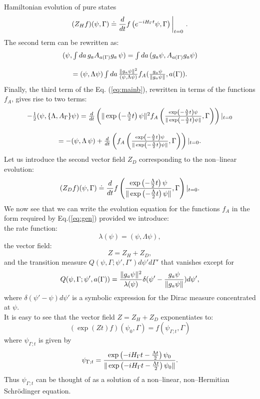 \documentclass[12pt]{article}
\def\be{\begin{equation}}
\def\ee{\end{equation}}
\def\ba{\begin{array}}
\def\ea{\end{array}}
\begin{document}
Hamiltonian evolution of pure states \be (Z_H f) (\psi,\Gamma)\doteq
{d\over dt}f\left (e^{-iH_{\Gamma} t} \psi,\Gamma \right)\bigg\vert_{t=0} \
.\label{eq:ham} \ee The second term can be rewritten as: \be \ba{c}
(\psi,\int da\, g_a A_{a(\Gamma)}g_a\, \psi) =\int da\,
(g_a\psi,A_{a(\Gamma)}g_a\psi)\cr\cr =(\psi,\Lambda\psi)\int da\, {\Vert
g_a\psi\Vert^2 \over {(\psi,\Lambda\psi )}} f_A({g_a\psi\over {\Vert
g_a\psi\Vert}},a(\Gamma)). \ea\label{eq:second} \ee Finally, the third term
of the Eq. (\ref{eq:mainb}), rewritten in terms of the functions $f_A$,
gives rise to two terms: \be \ba{c} -{1\over
2}(\psi,\{\Lambda,A_\Gamma\}\psi )= {d\over dt}\left( \Vert \exp\left(
-{\Lambda\over 2}t\right)\psi\Vert^2 f_A\left({\exp\left( -{\Lambda\over
2}t\right)\psi\over \Vert \exp\left( -{\Lambda\over
2}t\right)\psi\Vert},\Gamma\right)\right) \vert_{t=0}\cr\cr =
-(\psi,\Lambda\, \psi ) + {d\over dt}\left( f_A\left({\exp\left(
-{\Lambda\over 2}t\right)\psi\over \Vert \exp\left( -{\Lambda\over
2}t\right)\psi\Vert},\Gamma\right) \right)\vert_{t=0}. \ea \ee Let us
introduce the second vector field $Z_D$ corresponding to the non--linear
evolution: \be (Z_D f) (\psi,\Gamma)\doteq {d\over dt}f\left({\exp\left(
-{\Lambda\over 2}t \right)\psi\over \Vert \exp\left( -{\Lambda\over
2}t\right)\psi\Vert},\Gamma\right)\vert_{t=0}. \ee We now see that we can
write the evolution equation for the functions $f_A$ in the form required
by Eq.(\ref{eq:gen}) provided we introduce:\\ the rate function: \be
\lambda(\psi)=(\psi,\Lambda\psi), \label{eq:lam2}\ee the vector field: \be
Z=Z_H+Z_D ,\ee and the transition measure
$Q(\psi,\Gamma;\psi',\Gamma')d\psi'd\Gamma'$ that vanishes except for \be
Q(\psi,\Gamma;\psi',a(\Gamma))={\Vert g_a \psi \Vert^2\over
{\lambda(\psi)}} \delta (\psi'- {g_a\psi\over{\Vert g_a\psi\Vert}})d\psi',
\ee where $\delta(\psi'-\psi)d\psi'$ is a symbolic expression for the Dirac
measure concentrated at $\psi$.\\ It is easy to see that the vector field
$Z=Z_H+Z_D$ exponentiates to: \be \left(\exp
(Zt)f\right)(\psi_0,\Gamma)=f\left(\psi_{\Gamma;t},\Gamma\right) \ee where
$\psi_{\Gamma;t}$ is given by \be \psi_{\Gamma;t}={\exp\left(-iH_\Gamma
t-{{\Lambda t}\over 2}\right)\psi_0 \over{\Vert \exp\left(-iH_\Gamma
t-{{\Lambda t}\over 2}\right)\psi_0\Vert}}.\label{eq:schr}\ee
Thus $\psi_{\Gamma;t}$ can be thought of as a solution of a non--linear,
non--Hermitian Schr\"odinger equation.
\end{document}
